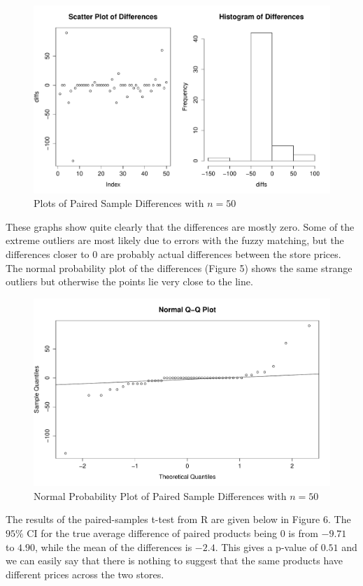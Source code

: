 \documentclass[12pt]{article}
\begin{document}
\begin{figure}[h]
\centering
\includegraphics[width=1.0\textwidth]{diffs}
\caption{Plots of Paired Sample Differences with $n=50$}
\end{figure}

These graphs show quite clearly that the differences are mostly zero. Some of the extreme outliers are most likely due to errors with the fuzzy matching, but the differences closer to $0$
are probably actual differences between the store prices. The normal probability plot of the differences (Figure 5) shows the same strange outliers but otherwise the points lie very close to the line.

\begin{figure}[h]
\centering
\includegraphics[width=1.0\textwidth]{diffs_qq}
\caption{Normal Probability Plot of Paired Sample Differences with $n=50$}
\end{figure}

The results of the paired-samples t-test from R are given below in Figure 6. The $95\%$ CI for the true average difference of paired products being $0$ is from $-9.71$ to $4.90$, while the mean of the differences is $-2.4$. This gives a p-value of $0.51$ and we can easily say that there is nothing to suggest that the same products have different prices across the two stores.
\end{document}
